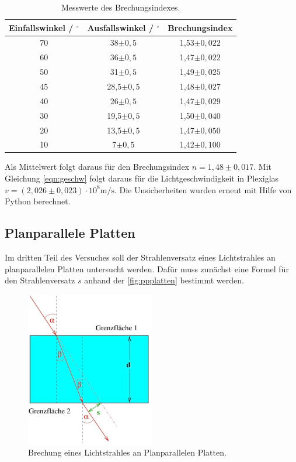 \begin{table}[H]
  \centering
  \caption{Messwerte des Brechungsindexes.}
  \label{tab:brech}
  \begin{tabular}{c c c}
    \toprule
    Einfallswinkel / $^{\circ}$ & Ausfallswinkel / $^{\circ}$ & Brechungsindex \\
    \midrule
    70 & 38$\pm 0,5$ & 1,53$\pm 0,022$\\
    60 & 36$\pm 0,5$ & 1,47$\pm 0,022$\\
    50 & 31$\pm 0,5$ & 1,49$\pm 0,025$\\
    45 & 28,5$\pm 0,5$ & 1,48$\pm 0,027$\\
    40 & 26$\pm 0,5$ & 1,47$\pm 0,029$\\
    30 & 19,5$\pm 0,5$ & 1,50$\pm 0,040$\\
    20 & 13,5$\pm 0,5$ & 1,47$\pm 0,050$\\
    10 & 7$\pm 0,5$ & 1,42$\pm 0,100$\\
    \bottomrule
  \end{tabular}
\end{table}

\noindent
Als Mittelwert folgt daraus für den Brechungsindex $n = 1,48 \pm 0,017$. Mit Gleichung \eqref{eqn:geschw} folgt daraus für die Lichtgeschwindigkeit in Plexiglas
$v = (2,026 \pm 0,023) \cdot 10^8 \si{\meter\per\second}$. Die Unsicherheiten wurden erneut mit Hilfe von Python berechnet.

\subsection{Planparallele Platten}

Im dritten Teil des Versuches soll der Strahlenversatz eines Lichtstrahles an planparallelen Platten untersucht werden. Dafür muss zunächst eine Formel für den Strahlenversatz
$s$ anhand der \autoref{fig:ppplatten} bestimmt werden.

\begin{figure}[H]
  \centering
  \includegraphics[width=0.5\textwidth]{data/ppplatten.jpeg}
  \caption{Brechung eines Lichtstrahles an Planparallelen Platten\cite{Anleitung400}.}
  \label{fig:ppplatten}
\end{figure}

